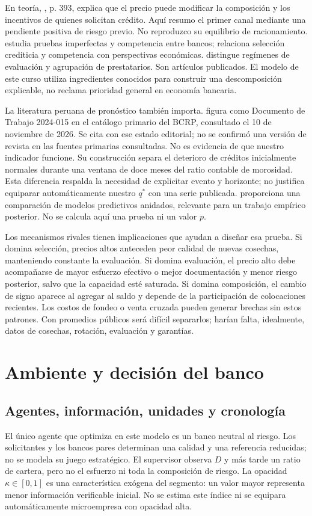 \documentclass[11pt]{article}
\theoremstyle{definition}\newtheorem{assumption}{Supuesto}
\begin{document}
En teoría, \citet{stiglitz1981}, p. 393, explica que el precio puede modificar
la composición y los incentivos de quienes solicitan crédito. Aquí resumo
el primer canal mediante una pendiente positiva de riesgo previo. No reproduzco
su equilibrio de racionamiento. \citet{broecker1990} estudia pruebas imperfectas
y competencia entre bancos; \citet{ruckes2004} relaciona selección crediticia
y competencia con perspectivas económicas. \citet{dellariccia2006} distingue
regímenes de evaluación y agrupación de prestatarios. Son artículos publicados.
El modelo de este curso utiliza ingredientes conocidos para construir una
descomposición explicable, no reclama prioridad general en economía bancaria.

La literatura peruana de pronóstico también importa. \citet{yamunaque2024}
figura como Documento de Trabajo 2024-015 en el catálogo primario del BCRP,
consultado el 10 de noviembre de 2026. Se cita con ese estado editorial; no se
confirmó una versión de revista en las fuentes primarias consultadas. No es
evidencia de que nuestro indicador funcione. Su construcción separa el
deterioro de créditos inicialmente normales durante una ventana de doce
meses del ratio contable de morosidad. Esta diferencia respalda la necesidad
de explicitar evento y horizonte; no justifica equiparar automáticamente
nuestro $q^*$ con una serie publicada. \citet{clark2007} proporciona una
comparación de modelos predictivos anidados, relevante para un trabajo empírico
posterior. No se calcula aquí una prueba ni un valor $p$.

Los mecanismos rivales tienen implicaciones que ayudan a diseñar esa prueba.
Si domina selección, precios altos anteceden peor calidad de nuevas cosechas,
manteniendo constante la evaluación. Si domina evaluación, el precio alto
debe acompañarse de mayor esfuerzo efectivo o mejor documentación y menor
riesgo posterior, salvo que la capacidad esté saturada. Si domina composición,
el cambio de signo aparece al agregar al saldo y depende de la participación
de colocaciones recientes. Los costos de fondeo o venta cruzada pueden generar
brechas sin estos patrones. Con promedios públicos será difícil separarlos;
harían falta, idealmente, datos de cosechas, rotación, evaluación y garantías.

\section{Ambiente y decisión del banco}\label{sec:model}
\subsection{Agentes, información, unidades y cronología}
El único agente que optimiza en este modelo es un banco neutral al riesgo.
Los solicitantes y los bancos pares determinan una calidad y una referencia
reducidas; no se modela su juego estratégico. El supervisor observa $D$ y más
tarde un ratio de cartera, pero no el esfuerzo ni toda la composición de riesgo.
La opacidad $\kappa\in[0,1]$ es una característica exógena del segmento: un
valor mayor representa menor información verificable inicial. No se estima
este índice ni se equipara automáticamente microempresa con opacidad alta.
\end{document}

